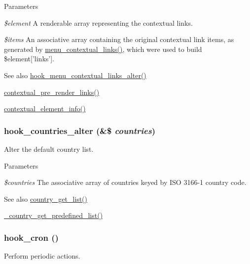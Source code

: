 \begin{DoxyParams}{Parameters}
\item[{\em \$element}]A renderable array representing the contextual links. \item[{\em \$items}]An associative array containing the original contextual link items, as generated by \hyperlink{group__menu_gad524d9a3415e24d27c7dbcb333d96cf8}{menu\_\-contextual\_\-links()}, which were used to build \$element\mbox{[}'links'\mbox{]}.\end{DoxyParams}
\begin{DoxySeeAlso}{See also}
\hyperlink{group__hooks_ga2731120f62502453acd650710f8252b9}{hook\_\-menu\_\-contextual\_\-links\_\-alter()} 

\hyperlink{contextual_8module_a8092553aa170452c7082015e1b930d6b}{contextual\_\-pre\_\-render\_\-links()} 

\hyperlink{contextual_8module_a2a9686f026c3602b46ba08f4b651edd6}{contextual\_\-element\_\-info()} 
\end{DoxySeeAlso}
\hypertarget{group__hooks_gaceba413e5b878b5f04668d1aa4fcb804}{
\subsubsection[{hook\_\-countries\_\-alter}]{\setlength{\rightskip}{0pt plus 5cm}hook\_\-countries\_\-alter (\&\$ {\em countries})}}
\label{group__hooks_gaceba413e5b878b5f04668d1aa4fcb804}
Alter the default country list.


\begin{DoxyParams}{Parameters}
\item[{\em \$countries}]The associative array of countries keyed by ISO 3166-\/1 country code.\end{DoxyParams}
\begin{DoxySeeAlso}{See also}
\hyperlink{locale_8inc_a53c04ad515e4f3eace3532fcdbedb834}{country\_\-get\_\-list()} 

\hyperlink{iso_8inc_aff85d3f51026d7fd9d19b7db14d85c0d}{\_\-country\_\-get\_\-predefined\_\-list()} 
\end{DoxySeeAlso}
\hypertarget{group__hooks_gaf07f1e3d98112fc2ba6920cf7ee6fb16}{
\subsubsection[{hook\_\-cron}]{\setlength{\rightskip}{0pt plus 5cm}hook\_\-cron ()}}
\label{group__hooks_gaf07f1e3d98112fc2ba6920cf7ee6fb16}
Perform periodic actions.

